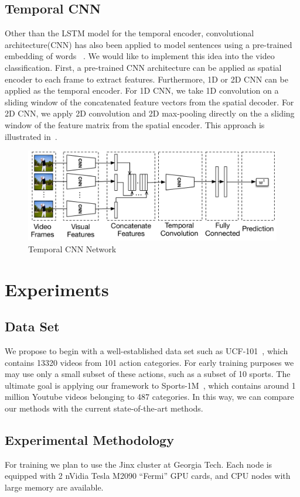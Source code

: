 \subsection{Temporal CNN}
Other than the LSTM model for the temporal encoder, convolutional architecture(CNN) has also been applied to model sentences using a pre-trained embedding of words ~\cite{cnnSC,cnnMNLS}. We would like to implement this idea into the video classification. First, a pre-trained CNN architecture can be applied as spatial encoder to each frame to extract features. Furthermore, 1D or 2D CNN can be applied as the temporal encoder. For 1D CNN, we take 1D convolution on a sliding window of the concatenated feature vectors from the spatial decoder. For 2D CNN, we apply 2D convolution and 2D max-pooling directly on the a sliding window of the feature matrix from the spatial encoder. This approach is illustrated in~.
\begin{figure}
  \centering
  \includegraphics[width=1.0\linewidth]{figs/tnn}
  \caption{Temporal CNN Network}
  \label{fig:tnn}
\end{figure}

\section{Experiments}
\subsection{Data Set}
We propose to begin with a well-established data set such as UCF-101~\cite{ucf101}, which contains 13320 videos from 101 action categories. For early training purposes we may use only a small subset of these actions, such as a subset of 10 sports. The ultimate goal is applying our framework to Sports-1M~\cite{cnnvid}, which contains around 1 million Youtube videos belonging to 487 categories. In this way, we can compare our methods with the current state-of-the-art methods.

\subsection{Experimental Methodology}
For training we plan to use the Jinx cluster at Georgia Tech. Each node is equipped with 2 nVidia Tesla M2090 ``Fermi'' GPU cards, and CPU nodes with large memory are available.

